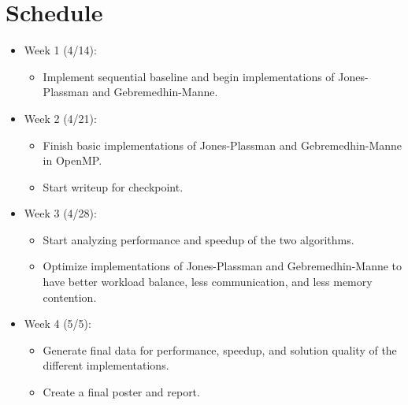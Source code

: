 \documentclass[11pt]{article}
\newcommand{\qlistb}[1] {\begin{itemize}[label=\textbullet~] #1 \end{itemize}}
\begin{document}
\section{Schedule}
\qlistb{
	\item Week 1 (4/14):
	\qlistb{
		\item Implement sequential baseline and begin implementations of Jones-Plassman and Gebremedhin-Manne.
	}
	\item Week 2 (4/21):
	\qlistb{
		\item Finish basic implementations of Jones-Plassman and Gebremedhin-Manne in OpenMP. 
		\item Start writeup for checkpoint.
	}
	\item Week 3 (4/28):
	\qlistb{
		\item Start analyzing performance and speedup of the two algorithms. 
		\item Optimize implementations of Jones-Plassman and Gebremedhin-Manne to have better workload balance, less communication, and less memory contention.
	}
	\item Week 4 (5/5):
	\qlistb{
		\item Generate final data for performance, speedup, and solution quality of the different implementations. 
		\item Create a final poster and report. 
	}
}
\end{document}

